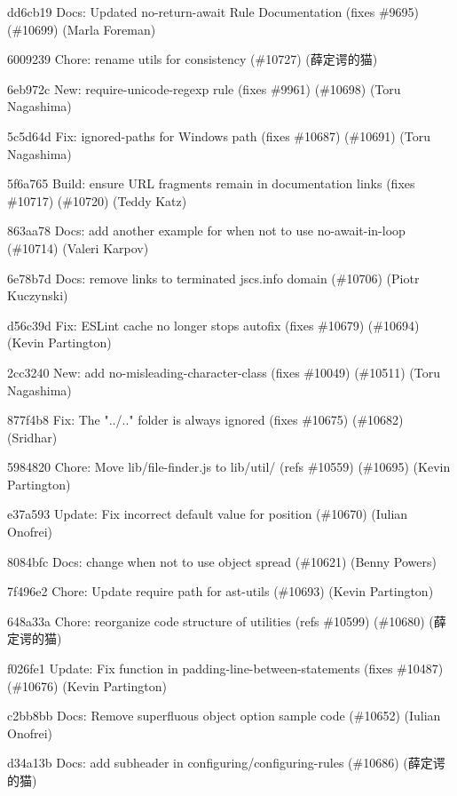\begin{DoxyItemize}
\item dd6cb19 Docs\+: Updated no-\/return-\/await Rule Documentation (fixes \#9695) (\#10699) (Marla Foreman)
\item 6009239 Chore\+: rename utils for consistency (\#10727) (薛定谔的猫)
\item 6eb972c New\+: require-\/unicode-\/regexp rule (fixes \#9961) (\#10698) (Toru Nagashima)
\item 5c5d64d Fix\+: ignored-\/paths for Windows path (fixes \#10687) (\#10691) (Toru Nagashima)
\item 5f6a765 Build\+: ensure URL fragments remain in documentation links (fixes \#10717) (\#10720) (Teddy Katz)
\item 863aa78 Docs\+: add another example for when not to use no-\/await-\/in-\/loop (\#10714) (Valeri Karpov)
\item 6e78b7d Docs\+: remove links to terminated jscs.\+info domain (\#10706) (Piotr Kuczynski)
\item d56c39d Fix\+: ESLint cache no longer stops autofix (fixes \#10679) (\#10694) (Kevin Partington)
\item 2cc3240 New\+: add no-\/misleading-\/character-\/class (fixes \#10049) (\#10511) (Toru Nagashima)
\item 877f4b8 Fix\+: The "{}../.."{} folder is always ignored (fixes \#10675) (\#10682) (Sridhar)
\item 5984820 Chore\+: Move lib/file-\/finder.\+js to lib/util/ (refs \#10559) (\#10695) (Kevin Partington)
\item e37a593 Update\+: Fix incorrect default value for position (\#10670) (Iulian Onofrei)
\item 8084bfc Docs\+: change when not to use object spread (\#10621) (Benny Powers)
\item 7f496e2 Chore\+: Update require path for ast-\/utils (\#10693) (Kevin Partington)
\item 648a33a Chore\+: reorganize code structure of utilities (refs \#10599) (\#10680) (薛定谔的猫)
\item f026fe1 Update\+: Fix \textquotesingle{}function\textquotesingle{} in padding-\/line-\/between-\/statements (fixes \#10487) (\#10676) (Kevin Partington)
\item c2bb8bb Docs\+: Remove superfluous object option sample code (\#10652) (Iulian Onofrei)
\item d34a13b Docs\+: add subheader in configuring/configuring-\/rules (\#10686) (薛定谔的猫)

\end{DoxyItemize}
